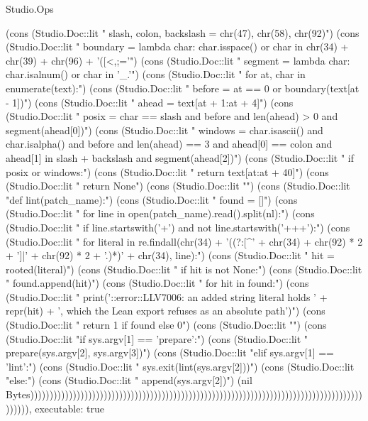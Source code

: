 \begin{lexlean}{Studio.Ops}
\begin{semanticmodule}
{    (cons (Studio.Doc::lit "    slash, colon, backslash = chr(47), chr(58), chr(92)\n")
    (cons (Studio.Doc::lit "    boundary = lambda char: char.isspace() or char in chr(34) + chr(39) + chr(96) + '([{<,;='\n")
    (cons (Studio.Doc::lit "    segment = lambda char: char.isalnum() or char in '_.'\n")
    (cons (Studio.Doc::lit "    for at, char in enumerate(text):\n")
    (cons (Studio.Doc::lit "        before = at == 0 or boundary(text[at - 1])\n")
    (cons (Studio.Doc::lit "        ahead = text[at + 1:at + 4]\n")
    (cons (Studio.Doc::lit "        posix = char == slash and before and len(ahead) > 0 and segment(ahead[0])\n")
    (cons (Studio.Doc::lit "        windows = char.isascii() and char.isalpha() and before and len(ahead) == 3 and ahead[0] == colon and ahead[1] in slash + backslash and segment(ahead[2])\n")
    (cons (Studio.Doc::lit "        if posix or windows:\n")
    (cons (Studio.Doc::lit "            return text[at:at + 40]\n")
    (cons (Studio.Doc::lit "    return None\n")
    (cons (Studio.Doc::lit "\n")
    (cons (Studio.Doc::lit "def lint(patch_name):\n")
    (cons (Studio.Doc::lit "    found = []\n")
    (cons (Studio.Doc::lit "    for line in open(patch_name).read().split(nl):\n")
    (cons (Studio.Doc::lit "        if line.startswith('+') and not line.startswith('+++'):\n")
    (cons (Studio.Doc::lit "            for literal in re.findall(chr(34) + '((?:[^' + chr(34) + chr(92) * 2 + ']|' + chr(92) * 2 + '.)*)' + chr(34), line):\n")
    (cons (Studio.Doc::lit "                hit = rooted(literal)\n")
    (cons (Studio.Doc::lit "                if hit is not None:\n")
    (cons (Studio.Doc::lit "                    found.append(hit)\n")
    (cons (Studio.Doc::lit "    for hit in found:\n")
    (cons (Studio.Doc::lit "        print('::error::LLV7006: an added string literal holds ' + repr(hit) + ', which the Lean export refuses as an absolute path')\n")
    (cons (Studio.Doc::lit "    return 1 if found else 0\n")
    (cons (Studio.Doc::lit "\n")
    (cons (Studio.Doc::lit "if sys.argv[1] == 'prepare':\n")
    (cons (Studio.Doc::lit "    prepare(sys.argv[2], sys.argv[3])\n")
    (cons (Studio.Doc::lit "elif sys.argv[1] == 'lint':\n")
    (cons (Studio.Doc::lit "    sys.exit(lint(sys.argv[2]))\n")
    (cons (Studio.Doc::lit "else:\n")
    (cons (Studio.Doc::lit "    append(sys.argv[2])\n")
    (nil Bytes)))))))))))))))))))))))))))))))))))))))))))))))))))))))))))))))))))))))))))))))))))))))))))),
  executable: true
}

}
\end{semanticmodule}
\end{lexlean}
